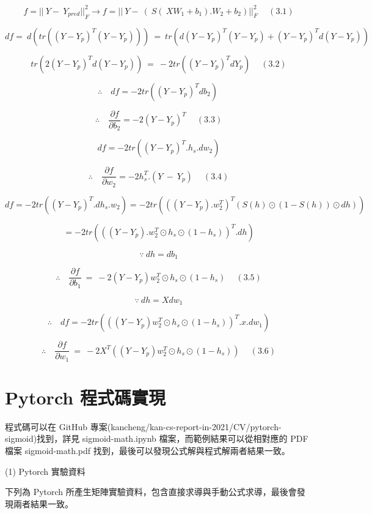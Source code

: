 \documentclass[11pt,UTF8]{ctexart}
\begin{document}
$$f={||\ Y - \ Y_{pred}||}_F^2 \rightarrow f={||\ Y - \ ( \ S( \ XW_{1} + b_{1}).W_{2} + b_{2} )||}_F^2  \quad \ (3.1)$$

$$ df=\ d(tr({(Y-Y_p)}^T(Y-Y_p)))\ =\ tr(d{(Y-Y_p)}^T(Y-Y_p)+{(Y-Y_p)}^Td(Y-Y_p)) $$

$$tr({2(Y-Y_p)}^Td(Y-Y_p))\ =\ -2tr({(Y-Y_p)}^TdY_p)  \quad \ (3.2)$$


$$\therefore\quad df=-2tr({(Y-Y_p)}^Tdb_2)\ $$

$$\therefore\quad \frac{\partial f}{\partial b_2}=-2{(Y-Y_p)}^T  \quad \ (3.3)$$

$$df=-2tr({(Y-Y_p)}^T . h_s. dw_2)$$

$$\therefore\quad \frac{\partial f}{\partial w_2}=-2h_s^T.(Y\ -\ Y_p) \quad \ (3.4)$$

$$df=-2tr\left(\left(Y-Y_p\right)^T.{dh}_s. w_2\right)=-2tr\left(\left(\left(Y-Y_p\right).w_2^T\right)^T\left(S(h)\odot(1-S(h))\odot d h\right)\right)$$

$$=-2tr\left(\left(\left(Y-Y_p\right).w_2^T\odot h_s\odot(1-h_s)\right)^T.dh\right)$$

$$\because \ dh = db_{1}$$

$$\therefore\quad \frac{\partial f}{\partial b_1}\ =\ -2(Y-Y_p)w_2^T\odot h_s\odot(1-h_s)  \quad \ (3.5)$$

$$\because \ dh = Xdw_{1}$$

$$\therefore\quad df=-2tr({((Y-Y_p)w_2^T\odot h_s\odot(1-h_s))}^T . x . dw_1)$$

$$\therefore\quad \frac{\partial f}{\partial w_1}\ =\ -2X^T((Y-Y_p)w_2^T\odot h_s\odot(1-h_s)) \quad \ (3.6)$$


\section{Pytorch 程式碼實現}

程式碼可以在 GitHub 專案(kancheng/kan-cs-report-in-2021/CV/pytorch-sigmoid)找到，詳見 sigmoid-math.ipynb 檔案，而範例結果可以從相對應的 PDF 檔案 sigmoid-math.pdf 找到，最後可以發現公式解與程式解兩者結果一致。

(1) Pytorch 實驗資料

下列為 Pytorch 所產生矩陣實驗資料，包含直接求導與手動公式求導，最後會發現兩者結果一致。
\newline
\end{document}
